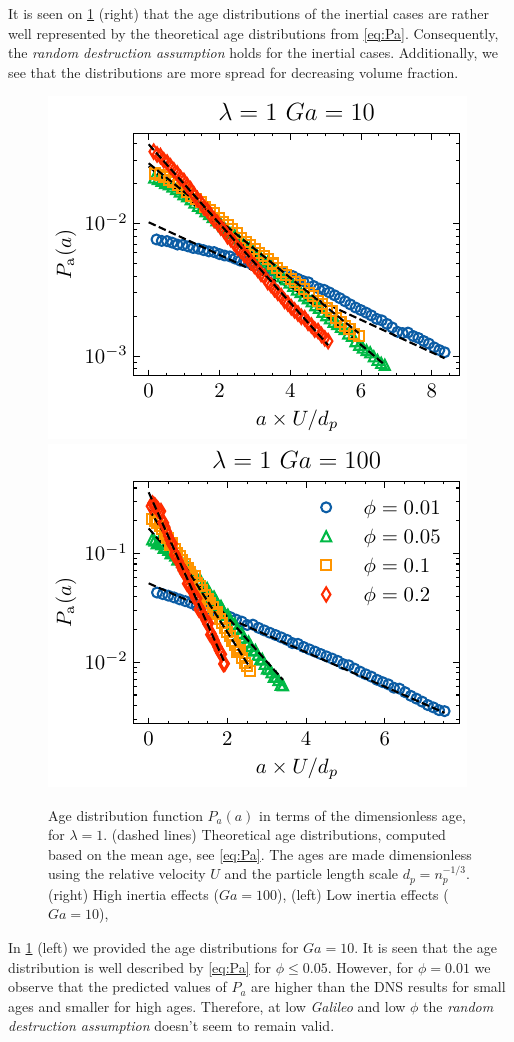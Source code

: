 It is seen on \ref{fig:age_picture} (right) that the age distributions of the inertial cases are rather well represented by the theoretical age distributions from \ref{eq:Pa}.
Consequently, the \textit{random destruction assumption} holds for the inertial cases. 
Additionally, we see that the distributions are more spread for decreasing volume fraction. 
\begin{figure}[h!]
    \centering
    \includegraphics[height = 0.3\textwidth]{image/HOMOGENEOUS_NEW/Dist/Pa_l_1_Ga_10.pdf}
    \includegraphics[height = 0.3\textwidth]{image/HOMOGENEOUS_NEW/Dist/Pa_l_1_Ga_100.pdf}
    \caption{
    Age distribution function $P_a(a)$ in terms of the dimensionless age, for $\lambda = 1$.
    (dashed lines) Theoretical age distributions, computed based on the mean age, see \ref{eq:Pa}. 
    The ages are made dimensionless using the relative velocity $U$ and the particle length scale $d_p = n_p^{-1/3}$.  
    (right) High inertia effects ($Ga = 100$),
    (left) Low inertia effects ($Ga = 10$),
    }
    \label{fig:age_picture}
\end{figure}
In \ref{fig:age_picture} (left)  we provided the age distributions for $Ga = 10$. 
It is seen that the age distribution is well described by \ref{eq:Pa} for $\phi \le 0.05$.
However, for $\phi = 0.01$ we observe that the predicted values of $P_a$ are higher than the DNS results for small ages and smaller for high ages. 
Therefore, at low \textit{Galileo} and low $\phi$ the \textit{random destruction assumption} doesn't seem to remain valid. 

